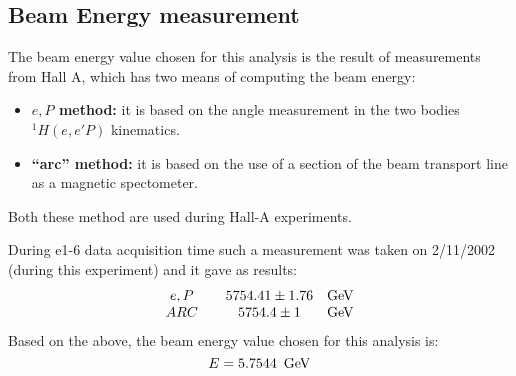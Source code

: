 \subsection{Beam Energy measurement} 
The beam energy value chosen for this analysis is the result of measurements from Hall A, which
has two means of computing the beam energy:
\begin{itemize}
\item{\boldmath \bf $e,P$ method:} it is based on the angle measurement in the two bodies $^1H(e,e' P)$ kinematics.
\item{\bf ``arc'' method:}  it is based on the use of a section of the beam transport line as a magnetic spectometer.
\end{itemize}
Both these method are used during Hall-A experiments.

During e1-6 data acquisition time such a measurement was taken on 
2/11/2002 (during this experiment) and it gave as results:
$$
\begin{array}{c c c c}
e,P & & 5754.41 \pm 1.76 & {\rm GeV}\\
ARC & & 5754.4 \pm 1 & {\rm GeV}\\
\end{array}
$$
Based on the above, the beam energy value chosen for this analysis is:
$$
E = 5.7544 \,\,\,{\rm GeV}
$$
